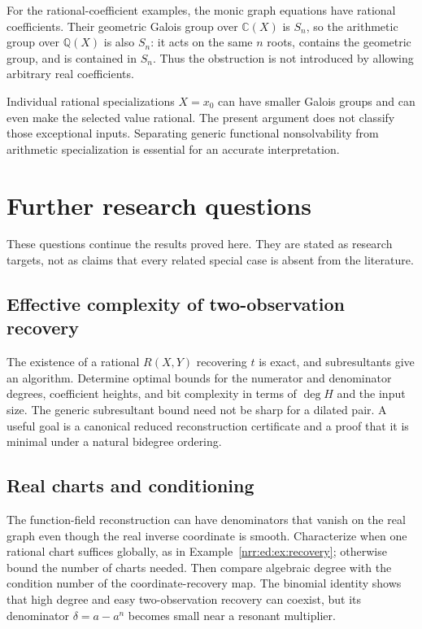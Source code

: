 \documentclass[11pt,letterpaper]{article}
\theoremstyle{definition}
\theoremstyle{remark}
\newcommand{\C}{\mathbb C}
\newcommand{\Q}{\mathbb Q}
\begin{document}
For the rational-coefficient examples, the monic graph equations have rational
coefficients. Their geometric Galois group over $\C(X)$ is $S_n$, so the
arithmetic group over $\Q(X)$ is also $S_n$: it acts on the same $n$ roots,
contains the geometric group, and is contained in $S_n$. Thus the obstruction
is not introduced by allowing arbitrary real coefficients.

Individual rational specializations $X=x_0$ can have smaller Galois groups and
can even make the selected value rational. The present argument does not
classify those exceptional inputs. Separating generic functional nonsolvability
from arithmetic specialization is essential for an accurate interpretation.

\section{Further research questions}
\label{nrr:ed:sec:questions}

These questions continue the results proved here. They are stated as research
targets, not as claims that every related special case is absent from the literature.

\subsection{Effective complexity of two-observation recovery}

The existence of a rational $R(X,Y)$ recovering $t$ is exact, and subresultants
give an algorithm. Determine optimal bounds for the numerator and denominator
degrees, coefficient heights, and bit complexity in terms of $\deg H$ and the
input size. The generic subresultant bound need not be sharp for a dilated pair.
A useful goal is a canonical reduced reconstruction certificate and a proof
that it is minimal under a natural bidegree ordering.

\subsection{Real charts and conditioning}

The function-field reconstruction can have denominators that vanish on the real
graph even though the real inverse coordinate is smooth. Characterize when one
rational chart suffices globally, as in Example~\ref{nrr:ed:ex:recovery}; otherwise bound
the number of charts needed. Then compare algebraic degree with the condition
number of the coordinate-recovery map. The binomial identity shows that high
degree and easy two-observation recovery can coexist, but its denominator
$\delta=a-a^n$ becomes small near a resonant multiplier.
\end{document}
